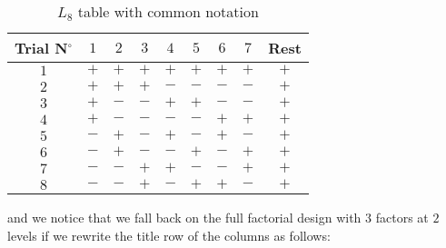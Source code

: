 	\begin{table}[H]\centering
	\begin{center}
			\begin{tabular}{|c|c|c|c|c|c|c|c|c|}
				\hline
				\multicolumn{1}{c}{\cellcolor{black!30}\textbf{Trial N${}^\circ$}} & 
  \multicolumn{1}{c}{\cellcolor{black!30}$1$} & 
  \multicolumn{1}{c}{\cellcolor{black!30}$2$} & 
  \multicolumn{1}{c}{\cellcolor{black!30}$3$} & 
  \multicolumn{1}{c}{\cellcolor{black!30}$4$} & 
  \multicolumn{1}{c}{\cellcolor{black!30}$5$} & 
  \multicolumn{1}{c}{\cellcolor{black!30}$6$} & 
  \multicolumn{1}{c}{\cellcolor{black!30}$7$} & \multicolumn{1}{c}{\cellcolor{black!30}\textbf{Rest}} \\ \hline
				$1$ & $+$ & $+$ & $+$ & $+$ & $+$ & $+$ & $+$ & $+$\\ \hline
				$2$ & $+$ & $+$ & $+$ & $-$ & $-$ & $-$ & $-$ & $+$\\ \hline
				$3$ & $+$ & $-$ & $-$ & $+$ & $+$ & $-$ & $-$ & $+$\\ \hline
				$4$ & $+$ & $-$ & $-$ & $-$ & $-$ & $+$ & $+$ & $+$\\ \hline
				$5$ & $-$ & $+$ & $-$ & $+$ & $-$ & $+$ & $-$ & $+$\\ \hline
				$6$ & $-$ & $+$ & $-$ & $-$ & $+$ & $-$ & $+$ & $+$\\ \hline
				$7$ & $-$ & $-$ & $+$ & $+$ & $-$ & $-$ & $+$ & $+$\\ \hline
				$8$ & $-$ & $-$ & $+$ & $-$ & $+$ & $+$ & $-$ & $+$\\ \hline
 		\end{tabular}
	\end{center}
	\caption{$L_8$ table with common notation}
	\end{table}
	and we notice that we fall back on the full factorial design with $3$ factors at $2$ levels if we rewrite the title row of the columns as follows:
